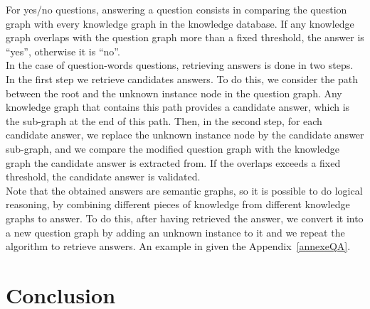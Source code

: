 \documentclass[12pt]{article}
\begin{document}
For yes/no questions, answering a question consists in comparing the question graph with every knowledge graph in the knowledge database. If any knowledge graph overlaps with the question graph more than a fixed threshold, the answer is ``yes'', otherwise it is ``no''.\\
In the case of question-words questions, retrieving answers is done in two steps. In the first step we retrieve candidates answers. To do this, we consider the path between the root and the unknown instance node in the question graph. Any knowledge graph that contains this path provides a candidate answer, which is the sub-graph at the end of this path. Then, in the second step, for each candidate answer, we replace the unknown instance node by the candidate answer sub-graph, and we compare the modified question graph with the knowledge graph the candidate answer is extracted from. If the overlaps exceeds a fixed threshold, the candidate answer is validated.\\
Note that the obtained answers are semantic graphs, so it is possible to do logical reasoning, by combining different pieces of knowledge from different knowledge graphs to answer. To do this, after having retrieved the answer, we convert it into a new question graph by adding an unknown instance to it and we repeat the algorithm to retrieve answers. An example in given the Appendix~\ref{annexeQA}.

\newpage
\section{Conclusion}
\end{document}
